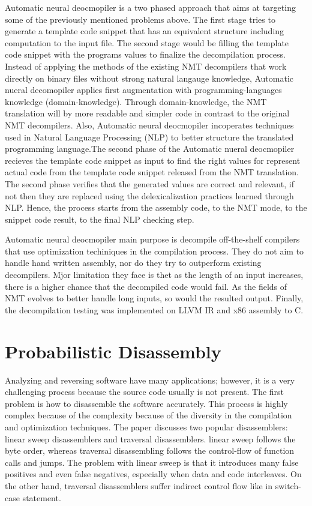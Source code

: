 \documentclass{article}
\begin{document}
Automatic neural deocmopiler is a two phased approach that aims at targeting some of the previously mentioned problems above. The first stage tries to generate a template code snippet that has an equivalent structure including computation to the input file. The second stage would be filling the template code snippet with the programs values to finalize the decompilation process.
Instead of applying the methods of the existing NMT decompilers that work directly on binary files without strong natural langauge knowledge, Automatic nueral decomopiler applies first augmentation with programming-languages knowledge (domain-knowledge). Through domain-knowledge, the NMT translation will by more readable and simpler code in contrast to the original NMT decompilers.
Also, Automatic neural deocmopiler incoperates techniques used in Natural Language Processing (NLP) to better structure the translated programming language.The second phase of the Automatic nueral deocmopiler recieves the template code snippet as input to find the right values for
represent actual code from the template code snippet released from the NMT translation. The second phase verifies that the generated values are correct and relevant, if not then they are replaced using the delexicalization practices learned through NLP. Hence, the process starts from the assembly code, to the NMT mode, to the snippet code result, to the final NLP checking step.

Automatic neural deocmopiler main purpose is decompile off-the-shelf compilers that use optimization techiniques in the compilation process. They do not aim to handle hand written assembly, nor do they try to outperform existing decompilers. Mjor limitation they face is thet as the length of an input
increases, there is a higher chance that the decompiled code would fail. As the fields of NMT evolves to better handle long inputs, so would the resulted output. Finally, the decompilation testing was implemented on LLVM IR
and x86 assembly to C.

\section{Probabilistic Disassembly}
Analyzing and reversing software have many applications; however, it is a very challenging process because the source code usually is not present. The first problem is how to disassemble the software accurately. This process is highly complex because of the complexity because of the diversity in the compilation and optimization techniques. The paper discusses two popular disassemblers: linear sweep disassemblers and traversal disassemblers. linear sweep follows the byte order, whereas traversal disassembling follows the control-flow of function calls and jumps. The problem with linear sweep is that it introduces many false positives and even false negatives, especially when data and code interleaves. On the other hand, traversal disassemblers suffer indirect control flow like in switch-case statement. \\
\end{document}
